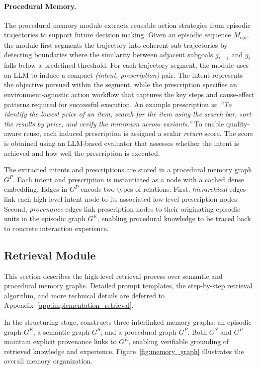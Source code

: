 \paragraph{Procedural Memory.}
The procedural memory module extracts reusable action strategies from episodic trajectories to support future decision making.
Given an episodic sequence $M_{\text{epi}}$, the module first segments the trajectory into coherent sub-trajectories by detecting boundaries where the similarity between adjacent subgoals $g_{t-1}$ and $g_t$ falls below a predefined threshold.
For each trajectory segment, the module uses an LLM to induce a compact \emph{(intent, prescription)} pair.
The intent represents the objective pursued within the segment, while the prescription specifies an environment-agnostic action workflow that captures the key steps and cause-effect patterns required for successful execution.
An example prescription is:
\emph{``To identify the lowest price of an item, search for the item using the search bar, sort the results by price, and verify the minimum across variants.''}
To enable quality-aware reuse, each induced prescription is assigned a scalar \emph{return} score.
The score is obtained using an LLM-based evaluator that assesses whether the intent is achieved and how well the prescription is executed.

The extracted intents and prescriptions are stored in a procedural memory graph $G^{P}$.
Each intent and prescription is instantiated as a node with a cached dense embedding.
Edges in $G^{P}$ encode two types of relations.
First, \emph{hierarchical} edges link each high-level intent node to its associated low-level prescription nodes.
Second, \emph{provenance} edges link prescription nodes to their originating episodic units in the episodic graph $G^{E}$, enabling procedural knowledge to be traced back to concrete interaction experience.


\subsection{Retrieval Module}
\label{subsec:retrieval}

This section describes the high-level retrieval process over semantic and procedural memory graphs.
Detailed prompt templates, the step-by-step retrieval algorithm, and more technical details are deferred to Appendix~\ref{app:implementation_retrieval}.

In the structuring stage, \plugmem constructs three interlinked memory graphs: an episodic graph $G^{E}$, a semantic graph $G^{S}$, and a procedural graph $G^{P}$.
Both $G^{S}$ and $G^{P}$ maintain explicit provenance links to $G^{E}$, enabling verifiable grounding of retrieved knowledge and experience.
Figure~\ref{fig:memory_graph} illustrates the overall memory organization.

